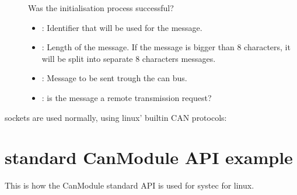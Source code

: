 \documentclass[a4paper,10pt,english]{sphinxmanual}
\begin{document}
\begin{fulllineitems}
\begin{fulllineitems}
\begin{description}
\item[{}] \leavevmode
Was the initialisation process successful? 

\item[{}] \leavevmode\begin{itemize}
\item {} 
: Identifier that will be used for the message. 

\item {} 
: Length of the message. If the message is bigger than 8 characters, it will be split into separate 8 characters messages. 

\item {} 
: Message to be sent trough the can bus. 

\item {} 
: is the message a remote transmission request? 

\end{itemize}

\end{description}


\end{fulllineitems}


\end{fulllineitems}


sockets are used normally, using linux’ built\sphinxhyphen{}in CAN protocols:

\begin{sphinxVerbatim}[commandchars=\\\{\}]
    
\end{sphinxVerbatim}


\section{standard CanModule API example}
\label{\detokenize{vendors/systec:standard-canmodule-api-example}}
This is how the CanModule standard API is used for systec for linux.
\end{document}
